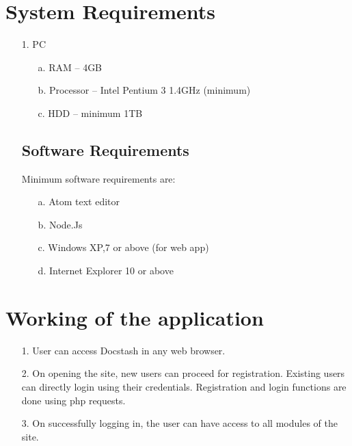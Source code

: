 \section{System Requirements}
\begin{itemize}

\subsection{Hardware Requirements:}




\item[1.] PC

\begin{itemize}

\item[a.] RAM –	4GB

\item[b.] Processor – Intel Pentium 3 1.4GHz (minimum)

\item[c.] HDD –	minimum 1TB

\end{itemize}




\subsection{Software Requirements}

Minimum software requirements are:

\begin{itemize}

\item[a.] Atom text editor  

\item[b.] Node.Js
\item[c.] Windows XP,7 or above (for web app)

\item[d.] Internet Explorer 10 or above


\end{itemize}

\end{itemize}

\section{Working of the application}
\begin{itemize}
\item[1.]User can access Docstash in any web browser.
\item[2.]On opening the site, new users can proceed for registration. Existing users can directly login using their credentials. Registration and login functions are done using php requests.
\item[3.]On successfully logging in, the user can have access to all modules of the site.

\end{itemize}




